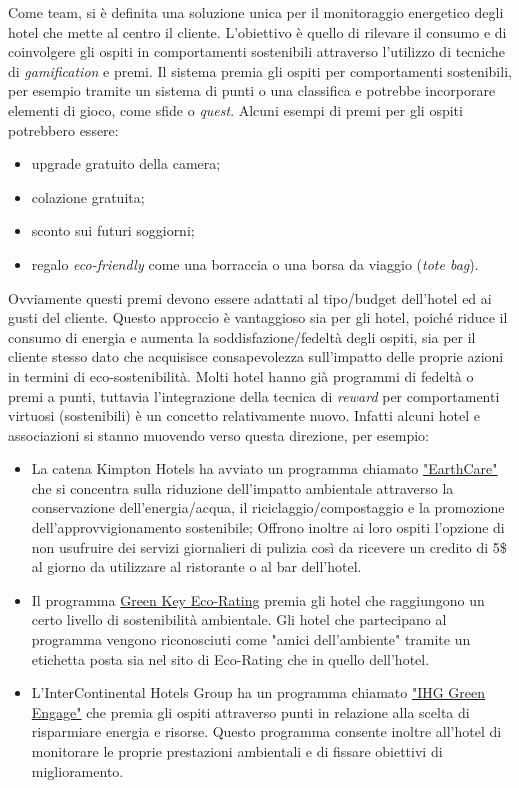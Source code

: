 Come team, si è definita una soluzione unica per il monitoraggio energetico degli hotel che mette al centro il cliente. L'obiettivo è quello di rilevare il consumo e di coinvolgere gli ospiti in comportamenti sostenibili attraverso l'utilizzo di tecniche di \textit{gamification} e premi. Il sistema premia gli ospiti per comportamenti sostenibili, per esempio tramite un sistema di punti o una classifica e potrebbe incorporare elementi di gioco, come sfide o \textit{quest}. Alcuni esempi di premi per gli ospiti potrebbero essere:
\begin{itemize}
    \item upgrade gratuito della camera;
    \item colazione gratuita;
    \item sconto sui futuri soggiorni;
    \item regalo \textit{eco-friendly} come una borraccia o una borsa da viaggio (\textit{tote bag}).
\end{itemize}
Ovviamente questi premi devono essere adattati al tipo/budget dell'hotel ed ai gusti del cliente. Questo approccio è vantaggioso sia per gli hotel, poiché riduce il consumo di energia e aumenta la soddisfazione/fedeltà degli ospiti, sia per il cliente stesso dato che acquisisce consapevolezza sull'impatto delle proprie azioni in termini di eco-sostenibilità.
%
Molti hotel hanno già programmi di fedeltà o premi a punti, tuttavia l'integrazione della tecnica di \textit{reward} per comportamenti virtuosi (sostenibili) è un concetto relativamente nuovo. Infatti alcuni hotel e associazioni si stanno muovendo verso questa direzione, per esempio:
\begin{itemize}
    \item La catena Kimpton Hotels ha avviato un programma chiamato \href{https://www.ihg.com/kimptonhotels/content/us/en/about-us/kimpton-cares/environment
    }{"EarthCare"}  che si concentra sulla riduzione dell'impatto ambientale attraverso la conservazione dell'energia/acqua, il riciclaggio/compostaggio e la promozione dell'approvvigionamento sostenibile; Offrono inoltre ai loro ospiti l'opzione di non usufruire dei servizi giornalieri di pulizia così da ricevere un credito di 5\$ al giorno da utilizzare al ristorante o al bar dell'hotel.
    \item Il programma \href{http://www.greenkeyglobal.com/home/green-key-eco-rating-2/
    }{Green Key Eco-Rating} premia gli hotel che raggiungono un certo livello di sostenibilità ambientale. Gli hotel che partecipano al programma vengono riconosciuti come "amici dell'ambiente" tramite un etichetta posta sia nel sito di Eco-Rating che in quello dell'hotel.
    \item L'InterContinental Hotels Group ha un programma chiamato \href{https://www.ihg.com/content/us/en/about/green-engage}{"IHG Green Engage"} che premia gli ospiti attraverso punti in relazione alla scelta di risparmiare energia e risorse. Questo programma consente inoltre all'hotel di monitorare le proprie prestazioni ambientali e di fissare obiettivi di miglioramento.
\end{itemize}
